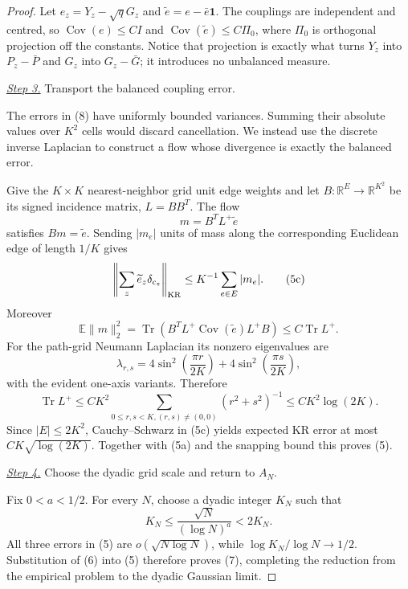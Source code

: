 \documentclass{smfart}
\theoremstyle{definition}
\newcommand{\1}{\mathbf 1}
\begin{document}
\begin{proof}
Let $e_ z=Y_ z-\sqrt qG_ z$ and
$\widetilde e=e-\bar e\mathbf1$.  The couplings are independent and
centred, so
$\operatorname {Cov}(e)\leq CI$ and
$\operatorname {Cov}(\widetilde e)\leq C\Pi_ 0$, where $\Pi_ 0$ is
orthogonal projection off the constants.  Notice that projection is
exactly what turns $Y_ z$ into $P_ z-\bar P$ and $G_ z$ into
$G_ z-\bar G$; it introduces no unbalanced measure.

\smallskip\noindent
\underline{\textit{Step 3.}} Transport the balanced coupling error.

The errors in (8) have uniformly bounded variances.  Summing their
absolute values over $K^2$ cells would discard cancellation.  We instead
use the discrete inverse Laplacian to construct a flow whose divergence
is exactly the balanced error.

Give
the $K\times K$ nearest-neighbor grid unit edge weights and let
$B:\mathbb R^E\to\mathbb R^{K^2}$ be its signed incidence matrix,
$L=BB^T$.  The flow
\begin{equation*}
m=B^TL^+\widetilde e
\end{equation*}
satisfies $Bm=\widetilde e$.  Sending $|m_ e|$ units of mass along
the corresponding Euclidean edge of length $1/K$ gives
\begin{equation}
\left\|\sum_ z\widetilde e_ z\delta_ {c_ z}\right\|_ {\rm KR}
\leq K^{-1}\sum_ {e\in E}|m_ e|.
\tag{5c}
\end{equation}
Moreover
\begin{equation*}
\mathbb E\|m\|_ 2^2
=\operatorname {Tr}\!\left(B^TL^+\operatorname {Cov}(\widetilde e)
L^+B\right)
\leq C\operatorname {Tr}L^+.
\end{equation*}
For the path-grid Neumann Laplacian its nonzero eigenvalues are
\begin{equation*}
\lambda_{r,s}=4\sin^2\!\left(\frac{\pi r}{2K}\right)+4\sin^2\!\left(\frac{\pi s}{2K}\right),
\end{equation*}
with the evident one-axis variants.  Therefore
\begin{equation}
\operatorname {Tr}L^+
\leq CK^2\sum_ {0\leq r,s<K,(r,s)\ne(0,0)}(r^2+s^2)^{-1}
\leq CK^2\log(2K).
\tag{5d}
\end{equation}
Since $|E|\leq2K^2$, Cauchy--Schwarz in (5c) yields expected KR error
at most $CK\sqrt{\log(2K)}$.  Together with (5a) and the snapping
bound this proves (5).

\smallskip\noindent
\underline{\textit{Step 4.}} Choose the dyadic grid scale and return to $A_N$.

Fix $0<a<1/2$. For every $N$, choose a dyadic integer $K_ N$ such
that
\begin{equation*}
K_ N\leq\frac{\sqrt N}{(\log N)^a}<2K_ N.
\end{equation*}
All three errors in (5) are $o(\sqrt{N\log N})$, while
$\log K_ N/\log N\to1/2$.  Substitution of (6) into (5) therefore
proves (7), completing the reduction from the empirical problem to the
dyadic Gaussian limit.

\end{proof}
\end{document}
